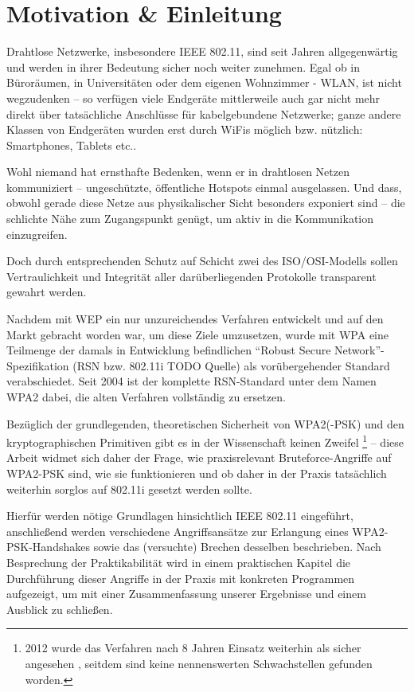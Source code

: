 \section{Motivation \& Einleitung}
Drahtlose Netzwerke, insbesondere IEEE 802.11, sind seit Jahren allgegenwärtig und werden in ihrer Bedeutung sicher noch weiter zunehmen. Egal ob in Büroräumen, in Universitäten oder dem eigenen Wohnzimmer - WLAN, ist nicht wegzudenken -- so verfügen viele Endgeräte mittlerweile auch gar nicht mehr direkt über tatsächliche Anschlüsse für kabelgebundene Netzwerke; ganze andere Klassen von Endgeräten wurden erst durch WiFis möglich bzw. nützlich: Smartphones, Tablets etc..

Wohl niemand hat ernsthafte Bedenken, wenn er in drahtlosen Netzen kommuniziert -- ungeschützte, öffentliche Hotspots einmal ausgelassen. Und dass, obwohl gerade diese Netze aus physikalischer Sicht besonders exponiert sind -- die schlichte Nähe zum Zugangspunkt genügt, um aktiv in die Kommunikation einzugreifen.

Doch durch entsprechenden Schutz auf Schicht zwei des ISO/OSI-Modells sollen Vertraulichkeit und Integrität aller darüberliegenden Protokolle transparent gewahrt werden.

Nachdem mit WEP ein nur unzureichendes Verfahren entwickelt und auf den Markt gebracht worden war, um diese Ziele umzusetzen, wurde mit WPA eine Teilmenge der damals in Entwicklung befindlichen \enquote{Robust Secure Network}-Spezifikation (RSN bzw. 802.11i TODO Quelle) als vorübergehender Standard verabschiedet. Seit 2004 ist der komplette RSN-Standard unter dem Namen WPA2 dabei, die alten Verfahren vollständig zu ersetzen.	

Bezüglich der grundlegenden, theoretischen Sicherheit von WPA2(-PSK) und den kryptographischen Primitiven gibt es in der Wissenschaft keinen Zweifel \footnote{2012 wurde das Verfahren nach 8 Jahren Einsatz weiterhin als sicher angesehen \cite{kumkar2012}, seitdem sind keine nennenswerten Schwachstellen gefunden worden.} -- diese Arbeit widmet sich daher der Frage, wie praxisrelevant Bruteforce-Angriffe auf WPA2-PSK sind, wie sie funktionieren und ob daher in der Praxis tatsächlich weiterhin sorglos auf 802.11i gesetzt werden sollte.

Hierfür werden nötige Grundlagen hinsichtlich IEEE 802.11 eingeführt, anschließend werden verschiedene Angriffsansätze zur Erlangung eines WPA2-PSK-Handshakes sowie das (versuchte) Brechen desselben beschrieben. Nach Besprechung der Praktikabilität wird in einem praktischen Kapitel die Durchführung dieser Angriffe in der Praxis mit konkreten Programmen aufgezeigt, um mit einer Zusammenfassung unserer Ergebnisse und einem Ausblick zu schließen.
